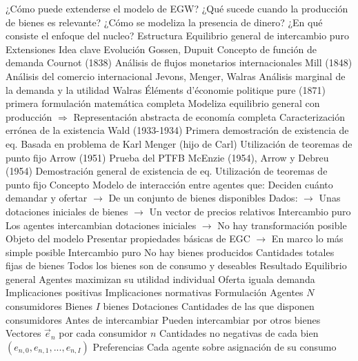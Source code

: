 \documentclass{nuevotema}
\begin{document}
\begin{esquemal}
			\3 ¿Cómo puede extenderse el modelo de EGW?
				\4 ¿Qué sucede cuando la producción de bienes es relevante?
				\4 ¿Cómo se modeliza la presencia de dinero?
				\4 ¿En qué consiste el enfoque del nucleo?
		\2 Estructura
			\3 Equilibrio general de intercambio puro
			\3 Extensiones
	\1 
		\2 Idea clave
			\3 Evolución
				\4 Gossen, Dupuit
				\4[] Concepto de función de demanda
				\4 Cournot (1838)
				\4[] Análisis de flujos monetarios internacionales
				\4 Mill (1848)
				\4[] Análisis del comercio internacional
				\4 Jevons, Menger, Walras
				\4[] Análisis marginal de la demanda y la utilidad
				\4 Walras
				\4[] Éléments d'économie politique pure (1871)
				\4[] primera formulación matemática completa
				\4[] Modeliza equilibrio general con producción
				\4[] $\Rightarrow$ Representación abstracta de economía completa
				\4[] Caracterización errónea de la existencia
				\4 Wald (1933-1934)
				\4[] Primera demostración de existencia de eq.
				\4[] Basada en problema de Karl Menger (hijo de Carl)
				\4[] Utilización de teoremas de punto fijo
				\4 Arrow (1951)
				\4[] Prueba del PTFB
				\4 McEnzie (1954), Arrow y Debreu (1954)
				\4[] Demostración general de existencia de eq.
				\4[] Utilización de teoremas de punto fijo
			\3 Concepto
				\4 Modelo de interacción entre agentes que:
				\4[] Deciden cuánto demandar y ofertar
				\4[] $\to$ De un conjunto de bienes disponibles
				\4[] Dados:
				\4[] $\to$ Unas dotaciones iniciales de bienes
				\4[] $\to$ Un vector de precios relativos
				\4 Intercambio puro
				\4[] Los agentes intercambian dotaciones iniciales
				\4[] $\to$ No hay transformación posible
			\3 Objeto del modelo
				\4 Presentar propiedades básicas de EGC
				\4[] $\to$ En marco lo más simple posible
				\4 Intercambio puro
				\4[] No hay bienes producidos
				\4[] Cantidades totales fijas de bienes
				\4[] Todos los bienes son de consumo y deseables
			\3 Resultado
				\4 Equilibrio general
				\4[] Agentes maximizan su utilidad individual
				\4[] Oferta iguala demanda
				\4 Implicaciones positivas
				\4 Implicaciones normativas
		\2 Formulación
			\3 Agentes
				\4 $N$ consumidores
			\3 Bienes
				\4 $I$ bienes
			\3 Dotaciones
				\4 Cantidades de las que disponen consumidores
				\4[] Antes de intercambiar
				\4[] Pueden intercambiar por otros bienes
				\4 Vectores $\vec{e}_n$ por cada consumidor $n$
				\4[] Cantidades no negativas de cada bien
				\4[] $(e_{n,0}, e_{n,1}, ..., e_{n,I})$
			\3 Preferencias
				\4 Cada agente sobre asignación de su consumo

\end{esquemal}
\end{document}
